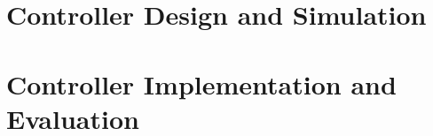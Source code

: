 \documentclass[preprint,authoryear,12pt]{elsarticle}
\begin{document}
%
%
%



\section{Controller Design and Simulation}\label{sec:ControllerDesignAndSimulation}



\section{Controller Implementation and Evaluation}\label{sec:ControllerImplementationAndEvaluation}








\end{document}
